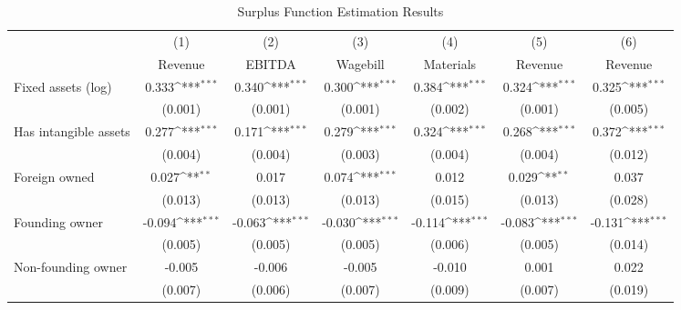 \begin{table}[htbp]\centering
\def\sym#1{\ifmmode^{#1}\else\(^{#1}\)\fi}
\caption{Surplus Function Estimation Results}
\begin{tabular}{l*{6}{c}}
\toprule
                    &\multicolumn{1}{c}{(1)}&\multicolumn{1}{c}{(2)}&\multicolumn{1}{c}{(3)}&\multicolumn{1}{c}{(4)}&\multicolumn{1}{c}{(5)}&\multicolumn{1}{c}{(6)}\\
                    &\multicolumn{1}{c}{Revenue}&\multicolumn{1}{c}{EBITDA}&\multicolumn{1}{c}{Wagebill}&\multicolumn{1}{c}{Materials}&\multicolumn{1}{c}{Revenue}&\multicolumn{1}{c}{Revenue}\\
\midrule
Fixed assets (log)  &       0.333\sym{***}&       0.340\sym{***}&       0.300\sym{***}&       0.384\sym{***}&       0.324\sym{***}&       0.325\sym{***}\\
                    &     (0.001)         &     (0.001)         &     (0.001)         &     (0.002)         &     (0.001)         &     (0.005)         \\
\addlinespace
Has intangible assets&       0.277\sym{***}&       0.171\sym{***}&       0.279\sym{***}&       0.324\sym{***}&       0.268\sym{***}&       0.372\sym{***}\\
                    &     (0.004)         &     (0.004)         &     (0.003)         &     (0.004)         &     (0.004)         &     (0.012)         \\
\addlinespace
Foreign owned       &       0.027\sym{**} &       0.017         &       0.074\sym{***}&       0.012         &       0.029\sym{**} &       0.037         \\
                    &     (0.013)         &     (0.013)         &     (0.013)         &     (0.015)         &     (0.013)         &     (0.028)         \\
\addlinespace
Founding owner      &      -0.094\sym{***}&      -0.063\sym{***}&      -0.030\sym{***}&      -0.114\sym{***}&      -0.083\sym{***}&      -0.131\sym{***}\\
                    &     (0.005)         &     (0.005)         &     (0.005)         &     (0.006)         &     (0.005)         &     (0.014)         \\
\addlinespace
Non-founding owner  &      -0.005         &      -0.006         &      -0.005         &      -0.010         &       0.001         &       0.022         \\
                    &     (0.007)         &     (0.006)         &     (0.007)         &     (0.009)         &     (0.007)         &     (0.019)         \\

\end{tabular}
\end{table}

